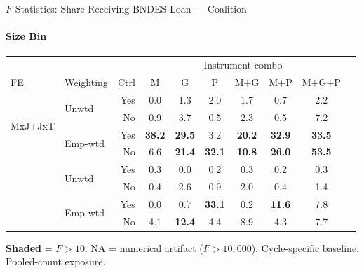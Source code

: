 \documentclass[aspectratio=169,10pt]{beamer}
\newcommand{\fpass}[1]{\cellcolor{pass}\textbf{#1}}
\begin{document}
\begin{frame}[t]{$F$-Statistics: Share Receiving BNDES Loan --- Coalition}
\framesubtitle{Size Bin}
\begin{center}
\footnotesize
\setlength{\tabcolsep}{3.5pt}
\renewcommand{\arraystretch}{1.05}
\begin{tabular}{@{}llrccccccc@{}}
\toprule
 & & & \multicolumn{6}{c}{Instrument combo} \\
\cmidrule(l{2pt}r{2pt}){4-9}
FE & Weighting & Ctrl & M & G & P & M+G & M+P & M+G+P \\
\midrule
  \multirow{4}{*}{MxJ+JxT} & \multirow{2}{*}{Unwtd} & Yes & 0.0 & 1.3 & 2.0 & 1.7 & 0.7 & 2.2 \\
   &  & No & 0.9 & 3.7 & 0.5 & 2.3 & 0.5 & 7.2 \\
   & \multirow{2}{*}{Emp-wtd} & Yes & \fpass{38.2} & \fpass{29.5} & 3.2 & \fpass{20.2} & \fpass{32.9} & \fpass{33.5} \\
   &  & No & 6.6 & \fpass{21.4} & \fpass{32.1} & \fpass{10.8} & \fpass{26.0} & \fpass{53.5} \\
\addlinespace[5pt]
  \multirow{4}{*}{MxJ+MxT} & \multirow{2}{*}{Unwtd} & Yes & 0.3 & 0.0 & 0.2 & 0.3 & 0.2 & 0.3 \\
   &  & No & 0.4 & 2.6 & 0.9 & 2.0 & 0.4 & 1.4 \\
   & \multirow{2}{*}{Emp-wtd} & Yes & 0.0 & 0.7 & \fpass{33.1} & 0.2 & \fpass{11.6} & 7.8 \\
   &  & No & 4.1 & \fpass{12.4} & 4.4 & 8.9 & 4.3 & 7.7 \\
\bottomrule
\end{tabular}
\end{center}
{\scriptsize \colorbox{pass}{\textbf{Shaded}} = $F>10$. NA = numerical artifact ($F>10{,}000$). Cycle-specific baseline. Pooled-count exposure.}
\end{frame}
\end{document}
